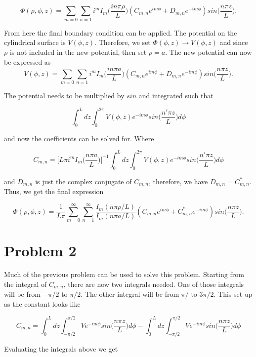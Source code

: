 \documentclass[11pt]{article}
\begin{document}
$$
\Phi(\rho, \phi, z) = \sum_{m = 0} \sum_{n = 1} i^{m} I_{m}\Big(\frac{in\pi \rho}{L}\Big) (C_{m, n} e^{im\phi} + D_{m, n} e^{-im\phi})sin\Big(\frac{n\pi z}{L} \Big).
$$

From here the final boundary condition can be applied. The potential on the cylindrical surface is $V(\phi, z)$. Therefore, we set $\Phi(\phi, z) \rightarrow V(\phi, z)$ and since $\rho$ is not included in the new potential, then set $\rho = a$. The new potential can now be expressed as 
$$
V(\phi, z) = \sum_{m = 0} \sum_{n = 1} i^{m} I_{m}\Big(\frac{in\pi a}{L}\Big) (C_{m, n} e^{im\phi} + D_{m, n} e^{-im\phi})sin\Big(\frac{n\pi z}{L} \Big).
$$

The potential needs to be multiplied by $sin$ and integrated such that

$$
\int_{0}^{L} dz \int_{0}^{2\pi} V(\phi, z)e^{-im\phi} sin\Big(\frac{n'\pi z}{L}\Big)d\phi
$$

and now the coefficients can be solved for. Where

$$
C_{m,n} = \Bigg[L\pi i^{m} I_{m}\Big(\frac{n \pi a}{L}\Big)\Bigg]^{-1} \int_{0}^{L} dz \int_{0}^{2\pi} V(\phi, z)e^{-im\phi} sin\Big(\frac{n'\pi z}{L}\Big)d\phi
$$

and $D_{m,n}$ is just the complex conjugate of $C_{m, n}$, therefore, we have $D_{m,n} = C_{m,n}^{*}$. Thus, we get the final expression 

$$
\Phi(\rho, \phi, z) = \frac{1}{L \pi} \sum_{m = 0}^{\infty} \sum_{n = 1}^{\infty} \frac{I_{m}(n\pi \rho / L)}{I_{m}(n\pi a / L)} (C_{m, n} e^{im\phi} + C_{m, n}^{*} e^{-im\phi}) sin\Big(\frac{n\pi z}{L} \Big).
$$

\clearpage

\section*{Problem 2}

Much of the previous problem can be used to solve this problem. Starting from the integral of $C_{m,n}$, there are now two integrals needed. One of those integrals will be from $-\pi/2$ to $\pi/2$. The other integral will be from $\pi/$ to $3\pi/2$. This set up as the constant looks like

$$
C_{m,n} = \int_{0}^{L} dz \int_{-\pi/2}^{\pi/2} V e^{-im\phi} sin\Big(\frac{n\pi z}{L}\Big)d\phi - \int_{0}^{L} dz \int_{-\pi/2}^{\pi/2} Ve^{-im\phi} sin\Big(\frac{n\pi z}{L}\Big)d\phi 
$$

Evaluating the integrals above we get
\end{document}
